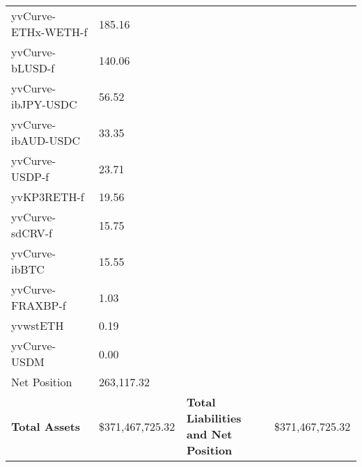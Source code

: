 \begin{longtable}{@{}p{0.25\linewidth}p{0.25\linewidth}p{0.25\linewidth}p{0.25\linewidth}@{}}
yvCurve-ETHx-WETH-f & 185.16 & & \\
yvCurve-bLUSD-f & 140.06 & & \\
yvCurve-ibJPY-USDC & 56.52 & & \\
yvCurve-ibAUD-USDC & 33.35 & & \\
yvCurve-USDP-f & 23.71 & & \\
yvKP3RETH-f & 19.56 & & \\
yvCurve-sdCRV-f & 15.75 & & \\
yvCurve-ibBTC & 15.55 & & \\
yvCurve-FRAXBP-f & 1.03 & & \\
yvwstETH & 0.19 & & \\
yvCurve-USDM & 0.00 & & \\
Net Position & 263,117.32 & & \\

\midrule

\textbf{Total Assets} & \$371,467,725.32 & \textbf{Total Liabilities and Net Position} & \$371,467,725.32 \\

\bottomrule

\end{longtable}
